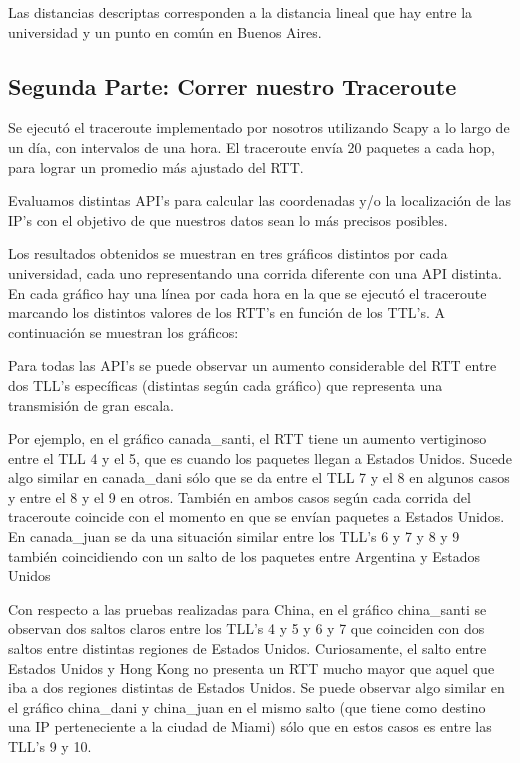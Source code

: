 Las distancias descriptas corresponden a la distancia lineal que hay entre la universidad y un punto en común en Buenos Aires.


\subsection{Segunda Parte: Correr nuestro Traceroute}

Se ejecutó el traceroute implementado por nosotros utilizando Scapy a lo largo de un día, con intervalos de una hora. El traceroute envía 20 paquetes a cada hop, para lograr un promedio más ajustado del RTT.

Evaluamos distintas API's para calcular las coordenadas y/o la localización de las IP's con el objetivo de que nuestros datos sean lo más precisos posibles.


Los resultados obtenidos se muestran en tres gráficos distintos por cada universidad, cada uno representando una corrida diferente con una API distinta. En cada gráfico hay una línea por cada hora en la que se ejecutó el traceroute marcando los distintos valores de los RTT's en función de los TTL's. A continuación se muestran los gráficos:


Para todas las API's se puede observar un aumento considerable del RTT entre dos TLL's específicas (distintas según cada gráfico) que representa una transmisión de gran escala. 

Por ejemplo, en el gráfico canada_santi, el RTT tiene un aumento vertiginoso entre el TLL 4 y el 5, que es cuando los paquetes llegan a Estados Unidos. Sucede algo similar en canada_dani sólo que se da entre el TLL 7 y el 8 en algunos casos y entre el 8 y el 9 en otros. También en ambos casos según cada corrida del traceroute coincide con el momento en que se envían paquetes a Estados Unidos. En canada_juan se da una situación similar entre los TLL's 6 y 7 y 8 y 9 también coincidiendo con un salto de los paquetes entre Argentina y Estados Unidos

Con respecto a las pruebas realizadas para China, en el gráfico china_santi se observan dos saltos claros entre los TLL's 4 y 5 y 6 y 7 que coinciden con dos saltos entre distintas regiones de Estados Unidos. Curiosamente, el salto entre Estados Unidos y Hong Kong no presenta un RTT mucho mayor que aquel que iba a dos regiones distintas de Estados Unidos. Se puede observar algo similar en el gráfico china_dani y china_juan en el mismo salto (que tiene como destino una IP perteneciente a la ciudad de Miami) sólo que en estos casos es entre las TLL's 9 y 10.



